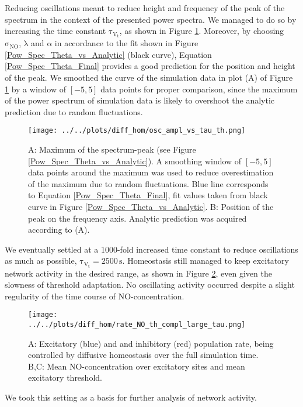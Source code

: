 \documentclass[10pt,a4paper]{article}
\begin{document}
Reducing oscillations meant to reduce height and frequency of the peak of the spectrum in the context of the presented power spectra. We managed to do so by increasing the time constant $\mathrm{\tau_{V_t}}$, as shown in Figure \ref{Peak_Prop_vs_Theta}. Moreover, by choosing $\mathrm{\sigma_{NO}}$, $\mathrm{\lambda}$ and $\mathrm{\alpha}$ in accordance to the fit shown in Figure \ref{Pow_Spec_Theta_vs_Analytic} (black curve), Equation \eqref{Pow_Spec_Theta_Final} provides a good prediction for the position and height of the peak. We smoothed the curve of the simulation data in plot (A) of Figure \ref{Peak_Prop_vs_Theta} by a window of $\mathrm{[-5,5]}$ data points for proper comparison, since the maximum of the power spectrum of simulation data is likely to overshoot the analytic prediction due to random fluctuations.  
\begin{figure}
\texttt{[image: ../../plots/diff\_hom/osc\_ampl\_vs\_tau\_th.png]}
\caption{A: Maximum of the spectrum-peak (see Figure \ref{Pow_Spec_Theta_vs_Analytic}). A smoothing window of $\mathrm{[-5,5]}$ data points around the maximum was used to reduce overestimation of the maximum due to random fluctuations. Blue line corresponds to Equation \eqref{Pow_Spec_Theta_Final}, fit values taken from black curve in Figure \ref{Pow_Spec_Theta_vs_Analytic}. B: Position of the peak on the frequency axis. Analytic prediction was acquired according to (A).}
\label{Peak_Prop_vs_Theta}
\end{figure} 
We eventually settled at a 1000-fold increased time constant to reduce oscillations as much as possible,  $\mathrm{\tau_{V_t}=2500\,s}$. Homeostasis still managed to keep excitatory network activity in the desired range, as shown in Figure \ref{full_sim_osci_slow_tau_th}, even given the slowness of threshold adaptation. No oscillating activity occurred despite a slight regularity of the time course of NO-concentration.  
\begin{figure}
\texttt{[image: ../../plots/diff\_hom/rate\_NO\_th\_compl\_large\_tau.png]}
\caption{A: Excitatory (blue) and and inhibitory (red) population rate, being controlled by diffusive homeostasis over the full simulation time. B,C: Mean NO-concentration over excitatory sites and mean excitatory threshold.}
\label{full_sim_osci_slow_tau_th}
\end{figure}
We took this setting as a basis for further analysis of network activity.
\end{document}
